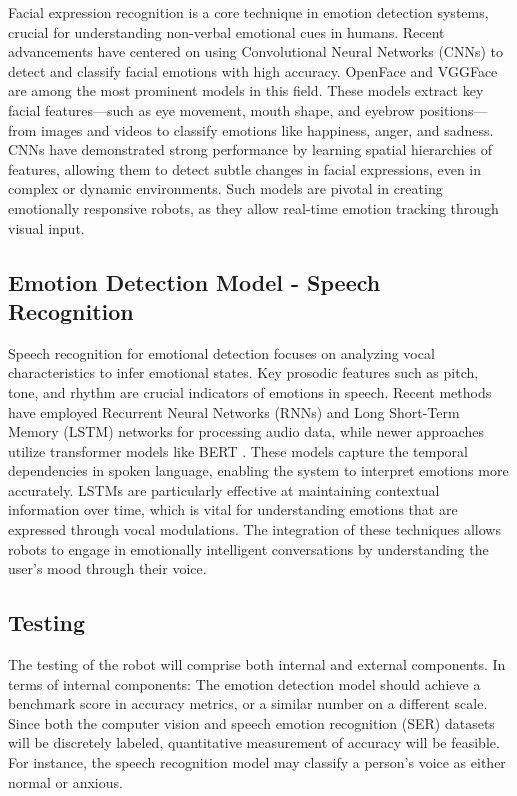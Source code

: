 Facial expression recognition is a core technique in emotion detection systems, crucial for understanding non-verbal emotional cues in humans. Recent advancements have centered on using Convolutional Neural Networks (CNNs) to detect and classify facial emotions with high accuracy. OpenFace \cite{baltrusaitis2018} and VGGFace \cite{zhang2023} are among the most prominent models in this field. These models extract key facial features—such as eye movement, mouth shape, and eyebrow positions—from images and videos to classify emotions like happiness, anger, and sadness. CNNs have demonstrated strong performance by learning spatial hierarchies of features, allowing them to detect subtle changes in facial expressions, even in complex or dynamic environments. Such models are pivotal in creating emotionally responsive robots, as they allow real-time emotion tracking through visual input.

\subsection{Emotion Detection Model - Speech Recognition}

Speech recognition for emotional detection focuses on analyzing vocal characteristics to infer emotional states. Key prosodic features such as pitch, tone, and rhythm are crucial indicators of emotions in speech. Recent methods have employed Recurrent Neural Networks (RNNs) and Long Short-Term Memory (LSTM) networks for processing audio data, while newer approaches utilize transformer models like BERT \cite{devlin2019}. These models capture the temporal dependencies in spoken language, enabling the system to interpret emotions more accurately. LSTMs are particularly effective at maintaining contextual information over time, which is vital for understanding emotions that are expressed through vocal modulations. The integration of these techniques allows robots to engage in emotionally intelligent conversations by understanding the user's mood through their voice.
\newpage
\subsection{Testing}

The testing of the robot will comprise both internal and external components. In terms of internal components: The emotion detection model should achieve a benchmark score in accuracy metrics, or a similar number on a different scale. Since both the computer vision and speech emotion recognition (SER) datasets will be discretely labeled, quantitative measurement of accuracy will be feasible. For instance, the speech recognition model may classify a person’s voice as either normal or anxious.

